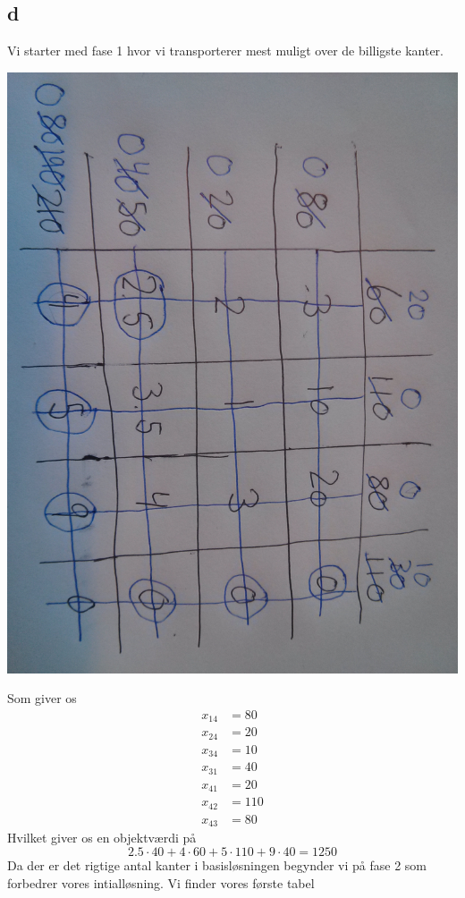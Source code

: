 \documentclass[a4paper]{article}
\begin{document}
\subsection*{d}
Vi starter med fase 1 hvor vi transporterer mest muligt over de billigste kanter.
\begin{center}
\includegraphics[scale=0.1, angle=90]{img22}
\end{center}
Som giver os 
\begin{align*}
x_{14}&=80 \\
x_{24}&=20 \\
x_{34}&=10 \\
x_{31}&=40 \\
x_{41}&=20 \\
x_{42}&=110\\
x_{43}&=80
\end{align*}
Hvilket giver os en objektværdi på
$$2.5\cdot 40+4\cdot 60+5\cdot 110+9\cdot 40 = 1250$$
Da der er det rigtige antal kanter i basisløsningen begynder vi på fase 2 som forbedrer vores intialløsning. Vi finder vores første tabel
\end{document}
